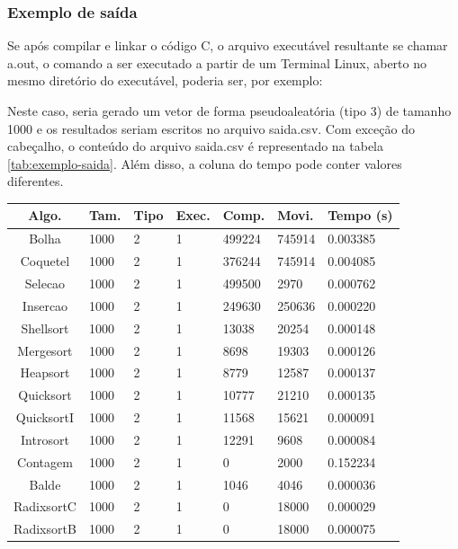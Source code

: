\subsubsection{Exemplo de saída}
Se após compilar e linkar o código C, o arquivo executável resultante se chamar a.out, o comando a ser executado a partir de um Terminal Linux, aberto no mesmo diretório do executável, poderia ser, por exemplo:

Neste caso, seria gerado um vetor de forma pseudoaleatória (tipo 3) de tamanho 1000 e os resultados seriam escritos no arquivo saida.csv. Com exceção do cabeçalho, o conteúdo do arquivo saida.csv é representado na tabela \ref{tab:exemplo-saida}. Além disso, a coluna do tempo pode conter valores diferentes.
\begin{table}[H]
    \centering
    \begin{tabular}{ | c | l | l | l | l | l | l | }
        \hline
        Algo.      & Tam. & Tipo & Exec. & Comp.  & Movi.  & Tempo (s)\\
        \hline
        Bolha      & 1000 & 2    & 1     & 499224 & 745914 & 0.003385\\ %
        Coquetel   & 1000 & 2    & 1     & 376244 & 745914 & 0.004085\\ %
        Selecao    & 1000 & 2    & 1     & 499500 & 2970   & 0.000762\\ %
        Insercao   & 1000 & 2    & 1     & 249630 & 250636 & 0.000220\\ %
        Shellsort  & 1000 & 2    & 1     & 13038  & 20254  & 0.000148\\ %
        Mergesort  & 1000 & 2    & 1     & 8698   & 19303  & 0.000126\\ %
        Heapsort   & 1000 & 2    & 1     & 8779   & 12587  & 0.000137\\ %
        Quicksort  & 1000 & 2    & 1     & 10777  & 21210  & 0.000135\\ %
        QuicksortI & 1000 & 2    & 1     & 11568  & 15621  & 0.000091\\ %
        Introsort  & 1000 & 2    & 1     & 12291  & 9608   & 0.000084\\ %
        Contagem   & 1000 & 2    & 1     & 0      & 2000   & 0.152234\\ %
        Balde      & 1000 & 2    & 1     & 1046   & 4046   & 0.000036\\ %
        RadixsortC & 1000 & 2    & 1     & 0      & 18000  & 0.000029\\ %
        RadixsortB & 1000 & 2    & 1     & 0      & 18000  & 0.000075\\
        \hline
    \end{tabular}
\end{table}

